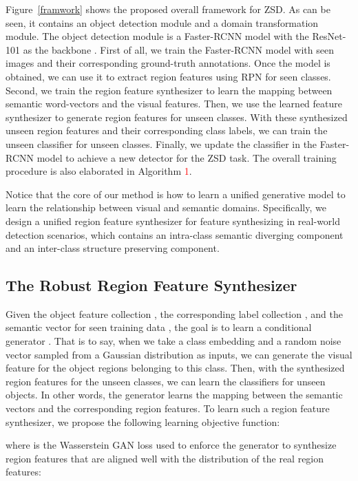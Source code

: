 \documentclass[10pt,twocolumn,letterpaper]{article}
\begin{document}
Figure~\ref{framwork} shows the proposed overall framework for ZSD. As can be seen,
it contains an object detection module and a domain transformation module. The object detection module is a Faster-RCNN model \cite{ren2016faster} with the ResNet-101 as the backbone \cite{he2016deep}. First of all, we train the Faster-RCNN model with seen images and their corresponding ground-truth annotations. Once the model is obtained, we can use it to extract region features using RPN for seen classes. Second, we train the region feature synthesizer to learn the mapping between semantic word-vectors and the visual features. Then, we use the learned feature synthesizer to generate region features for unseen classes. With these synthesized unseen region features and their corresponding class labels, we can train the unseen classifier for unseen classes. Finally, we update the classifier in the Faster-RCNN model to achieve a new detector for the ZSD task. The overall training procedure is also elaborated in Algorithm \textcolor{red}{1}. 

Notice that the core of our method is how to learn a unified generative model to learn the relationship between visual and semantic domains. Specifically, we design a unified region feature synthesizer for feature synthesizing in real-world detection scenarios, which contains an intra-class semantic diverging component and an inter-class structure preserving component. 




\subsection{The Robust Region Feature Synthesizer}

Given the object feature collection , the corresponding label collection , and the semantic vector  for seen training data , the goal is to learn a conditional generator . That is to say, when we take a class embedding  and a random noise vector  sampled from a Gaussian distribution as inputs, we can generate the visual feature  for the object regions belonging to this class. Then, with the synthesized region features for the unseen classes, we can learn the classifiers for unseen objects. In other words, the generator  learns the mapping between the semantic vectors and the corresponding region features. To learn such a region feature synthesizer, we propose the following learning objective function:

where  is the Wasserstein GAN loss \cite{arjovsky2017wasserstein} used to enforce the generator to synthesize region features that are aligned well with the distribution of the real region features:
\end{document}
